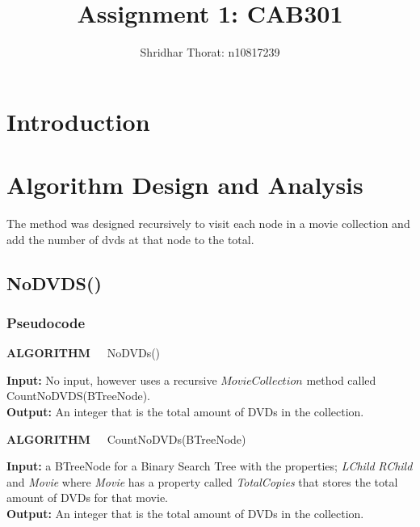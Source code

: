 \documentclass[a4paper]{article}
\begin{document}
\author{Shridhar Thorat: n10817239}
\title{Assignment 1: CAB301}
\maketitle
\tableofcontents
\setcounter{page}{0}
\pagebreak

\section{Introduction}

\section{Algorithm Design and Analysis}
The method  was designed recursively to visit each node in a movie collection and add the number of dvds at that node to the total. 

\subsection{NoDVDS{()}}
\subsubsection{Pseudocode}
\begin{algorithm}
    \caption*{\textbf{ALGORITHM~~}  NoDVDs{()}}
    \textbf{Input:} No input, however uses a recursive $MovieCollection$ method called CountNoDVDS{(BTreeNode)}. \\
    \textbf{Output:} An integer that is the total amount of DVDs in the collection.
 
    \begin{algorithmic}[1]
    \end{algorithmic}
\end{algorithm}

\begin{algorithm}
    \caption*{\textbf{ALGORITHM~~} CountNoDVDs{(BTreeNode)}}
    \textbf{Input:} a BTreeNode for a Binary Search Tree with the properties; \textit{LChild} \textit{RChild} and \textit{Movie} where \textit{Movie} has a property called \textit{TotalCopies} that stores the total amount of DVDs for that movie. \\
    \textbf{Output:} An integer that is the total amount of DVDs in the collection.

    \begin{algorithmic}[1]
        \EndIf{}
    \end{algorithmic}
\end{algorithm}
\end{document}
